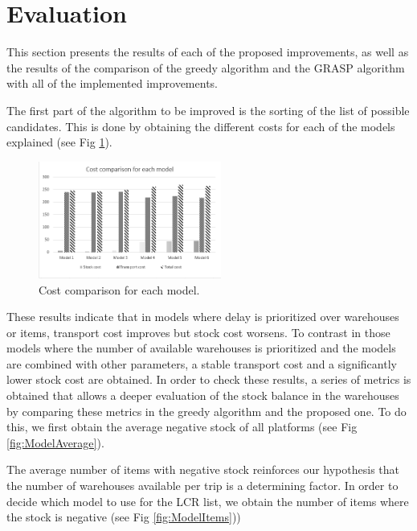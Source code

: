 \documentclass[letterpaper]{article} %
\begin{document}
\section*{Evaluation}


This section presents the results of each of the proposed improvements, as well as the results of the comparison of the greedy algorithm and the GRASP  algorithm with all of the implemented improvements.

The first part of the algorithm to be improved is the sorting of the list of possible candidates. This is done by obtaining the different costs for each of the models explained (see Fig \ref{fig:ModelCosts}). 

\begin{figure}[H]
    \includegraphics[width=6cm]{img/costcomparisionMODEL.png}
    \centering
    \caption{Cost comparison for each model.}
    \label{fig:ModelCosts}
\end{figure}

These results indicate that in models where delay is prioritized over warehouses or items, transport cost improves but stock cost worsens. To contrast in those models where the number of available warehouses is prioritized and the models are combined with other parameters, a stable transport cost and a significantly lower stock cost are obtained. In order to check these results, a series of metrics is obtained that allows a deeper evaluation of the stock balance in the warehouses by comparing these metrics in the greedy algorithm and the proposed one. To do this, we first obtain the average negative stock of all platforms (see Fig \ref{fig:ModelAverage}).

The average number of items with negative stock reinforces our hypothesis that the number of warehouses available per trip is a determining factor. In order to decide which model to use for the LCR list, we obtain the number of items where the stock is negative (see Fig \ref{fig:ModelItems}))
\end{document}
